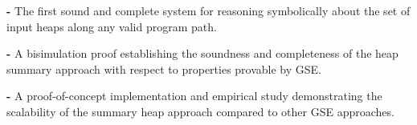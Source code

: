 



%
%
%





\begin{compactdesc}

\item\textbf{-} The first sound and complete system for reasoning symbolically about the 
set of input heaps along any valid program path. 

\item\textbf{-} A bisimulation proof establishing the soundness and 
completeness of the heap summary approach with respect to
properties provable by GSE.

\item\textbf{-} A proof-of-concept implementation and empirical study 
demonstrating the scalability of the summary heap approach
compared to other GSE approaches.

\end{compactdesc}


